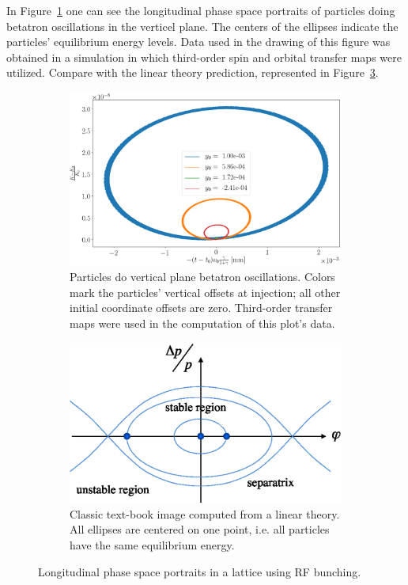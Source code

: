 \documentclass[preprint, review]{elsarticle}
\begin{document}
In Figure~\ref{fig:long_phase_port_3} one can see the longitudinal phase space portraits of particles
doing betatron oscillations in the verticel plane. The centers of the ellipses indicate the particles'
equilibrium energy levels. Data used in the drawing of this figure was obtained in a simulation in which
third-order spin and orbital transfer maps were utilized. Compare with the linear theory prediction, represented
in Figure~\ref{fig:long_phase_port_1}.

\begin{figure}[h]\centering
  \begin{subfigure}{\linewidth}
    \includegraphics[width=\linewidth]{img/decoh/psp_diagram_betatron}
    \caption{Particles do vertical plane betatron oscillations.
      Colors mark the particles' vertical offsets at injection; all other initial coordinate offsets are zero.
      Third-order transfer maps were used in the computation of this plot's data.\label{fig:long_phase_port_3}}
  \end{subfigure}
  \begin{subfigure}{\linewidth}
    \includegraphics[width=\linewidth]{img/decoh/psp_diagram.eps}
    \caption{Classic text-book image computed from a linear theory. All ellipses are centered
    on one point, i.e. all particles have the same equilibrium energy.\label{fig:long_phase_port_1}}
  \end{subfigure}
  \caption{Longitudinal phase space portraits in a lattice using RF bunching.}
\end{figure}
\end{document}
